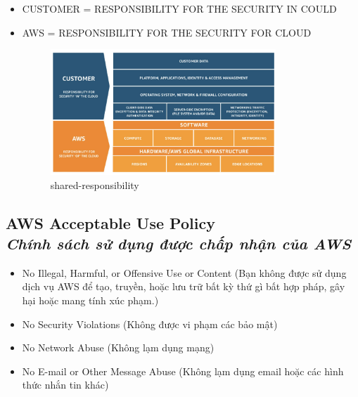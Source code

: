 \begin{itemize}
	\item CUSTOMER = RESPONSIBILITY FOR THE SECURITY IN COULD
	\item AWS = RESPONSIBILITY FOR THE SECURITY FOR CLOUD
	\begin{figure}[htbp]
		\centering
		\includegraphics[width=0.8\textwidth]{images/shared-responsibility}
		\caption{shared-responsibility}
		\label{fig:shared-responsibility}
	\end{figure}
\end{itemize}


\subsection[AWS Acceptable Use Policy]{AWS Acceptable Use Policy \\
	\textit{Chính sách sử dụng được chấp nhận của AWS}}

\begin{itemize}
	\item No Illegal, Harmful, or Offensive Use or Content (Bạn không được sử dụng dịch vụ AWS để tạo, truyền, hoặc lưu trữ bất kỳ thứ gì bất hợp pháp, gây hại hoặc mang tính xúc phạm.)
	\item No Security Violations (Không được vi phạm các bảo mật)
	\item No Network Abuse (Không lạm dụng mạng)
	\item No E-mail or Other Message Abuse  (Không lạm dụng email hoặc các hình thức nhắn tin khác)
\end{itemize}

























